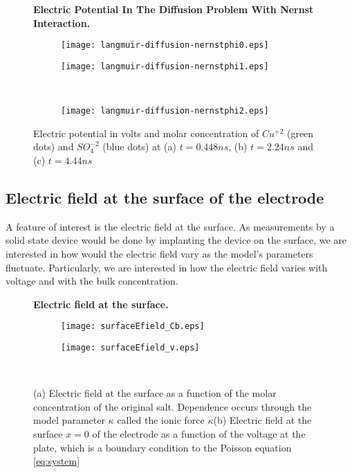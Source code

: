 \begin{figure}[htbp]
\centering
\textbf{Electric Potential In The Diffusion Problem With Nernst Interaction.}\par\medskip
\begin{subfigure}{.5\linewidth}
\centering
\texttt{[image: langmuir-diffusion-nernstphi0.eps]}
\caption{}
\label{fig:time-evol2_1}
\end{subfigure}%
\begin{subfigure}{.5\linewidth}
\centering
\texttt{[image: langmuir-diffusion-nernstphi1.eps]}
\caption{}
\label{fig:time-evol2_2}
\end{subfigure}\\[1ex]
\begin{subfigure}{\linewidth}
\centering
\texttt{[image: langmuir-diffusion-nernstphi2.eps]}
\caption{}
\label{fig:time-evol2_3}
\end{subfigure}
\caption{Electric potential in volts and molar concentration of $Cu^{+2}$ (green dots) and $SO_4^{-2}$ (blue dots) at (a) $t = 0.448 ns$, (b) $t = 2.24 ns$ and (c) $t = 4.44 ns$}
\label{fig:langmuir-diffusion-react}
\end{figure}


\newpage
\subsection{Electric field at the surface of the electrode}
\label{sec:analysis-efield}

A feature of interest is the electric field at the surface. As measurements by a solid state device would be done by implanting the device on the surface, we are interested in how would the electric field vary as the model's parameters fluctuate. Particularly, we are interested in how the electric field varies with voltage and with the bulk concentration.

\begin{figure}[htbp]
\centering
\textbf{Electric field at the surface.}\par\medskip
\begin{subfigure}{.5\linewidth}
\centering
\texttt{[image: surfaceEfield\_Cb.eps]}
\caption{}
\label{fig:ef1}
\end{subfigure}%
\begin{subfigure}{.5\linewidth}
\centering
\texttt{[image: surfaceEfield\_v.eps]}
\caption{}
\label{fig:ef2}
\end{subfigure}\\[1ex]
\caption{(a) Electric field at the surface as a function of the molar concentration of the original salt. Dependence occurs through the model parameter $\kappa$ called the ionic force $\kappa$(b) Electric field at the surface $x=0$ of the electrode as a function of the voltage at the plate, which is a boundary condition to the Poisson equation \ref{eq:system}}
\end{figure}




